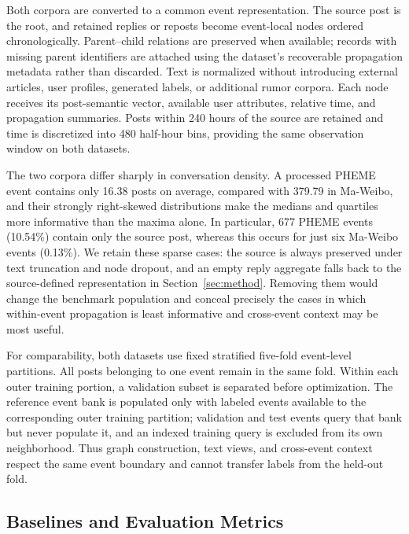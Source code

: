 \documentclass[sigconf,anonymous,review]{../acmart/acmart}
\begin{document}
Both corpora are converted to a common event representation.  The source post
is the root, and retained replies or reposts become event-local nodes ordered
chronologically.  Parent--child relations are preserved when available;
records with missing parent identifiers are attached using the dataset's
recoverable propagation metadata rather than discarded.  Text is normalized
without introducing external articles, user profiles, generated labels, or
additional rumor corpora.  Each node receives its post-semantic vector,
available user attributes, relative time, and propagation summaries.  Posts
within 240 hours of the source are retained and time is discretized into 480
half-hour bins, providing the same observation window on both datasets.

The two corpora differ sharply in conversation density.  A processed PHEME
event contains only 16.38 posts on average, compared with 379.79 in Ma-Weibo,
and their strongly right-skewed distributions make the medians and quartiles
more informative than the maxima alone.  In particular, 677 PHEME events
(10.54\%) contain only the source post, whereas this occurs for just six
Ma-Weibo events (0.13\%).  We retain these sparse cases: the source is always
preserved under text truncation and node dropout, and an empty reply aggregate
falls back to the source-defined representation in
Section~\ref{sec:method}.  Removing them would change the benchmark population
and conceal precisely the cases in which within-event propagation is least
informative and cross-event context may be most useful.

For comparability, both datasets use fixed stratified five-fold event-level
partitions.  All posts belonging to one event remain in the same fold.  Within
each outer training portion, a validation subset is separated before
optimization.  The reference event bank is populated only with labeled events
available to the corresponding outer training partition; validation and test
events query that bank but never populate it, and an indexed training query is
excluded from its own neighborhood.  Thus graph construction, text views, and
cross-event context respect the same event boundary and cannot transfer labels
from the held-out fold.

\subsection{Baselines and Evaluation Metrics}
\label{sec:baselines}
\end{document}
